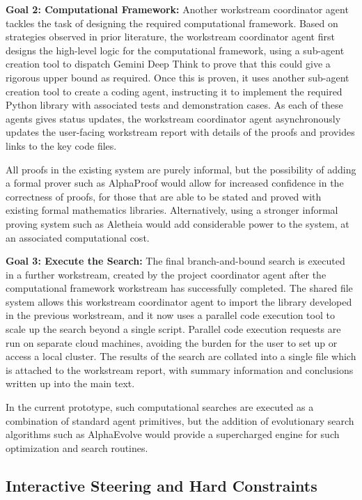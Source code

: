 \documentclass[11pt, a4paper, copyright, gdm]{google}
\begin{document}
\textbf{Goal 2: Computational Framework:} Another workstream coordinator agent tackles the task of designing the required computational framework.
Based on strategies observed in prior literature, the workstream coordinator agent first designs the high-level logic for the computational framework, using a sub-agent creation tool to dispatch Gemini Deep Think to prove that this could give a rigorous upper bound as required.
Once this is proven, it uses another sub-agent creation tool to create a coding agent, instructing it to implement the required Python library with associated tests and demonstration cases.
As each of these agents gives status updates, the workstream coordinator agent asynchronously updates the user-facing workstream report with details of the proofs and provides links to the key code files.

All proofs in the existing system are purely informal, but the possibility of adding a formal prover such as AlphaProof would allow for increased confidence in the correctness of proofs, for those that are able to be stated and proved with existing formal mathematics libraries.
Alternatively, using a stronger informal proving system such as Aletheia would add considerable power to the system, at an associated computational cost.

\textbf{Goal 3: Execute the Search:} The final branch-and-bound search is executed in a further workstream, created by the project coordinator agent after the computational framework workstream has successfully completed.
The shared file system allows this workstream coordinator agent to import the library developed in the previous workstream, and it now uses a parallel code execution tool to scale up the search beyond a single script.
Parallel code execution requests are run on separate cloud machines, avoiding the burden for the user to set up or access a local cluster.
The results of the search are collated into a single file which is attached to the workstream report, with summary information and conclusions written up into the main text.

In the current prototype, such computational searches are executed as a combination of standard agent primitives, but the addition of evolutionary search algorithms such as AlphaEvolve would provide a supercharged engine for such optimization and search routines.

\subsection{Interactive Steering and Hard Constraints}
\end{document}
